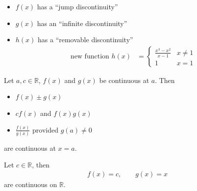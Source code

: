 \begin{itemize}
\item $f(x)$ has a ``jump discontinuity''
\item $g(x)$ has an ``infinite discontinuity''
\item $h(x)$ has a ``removable discontinuity''
\begin{align*}
\text{new function }h(x) &= \begin{cases}
\frac{x^3-x^2}{x-1} & x\neq 1\\
1 & x=1
\end{cases}
\end{align*}
\end{itemize}
\begin{theorem}\label{thm arith cont}
Let $a,c \in \mathbb{R}$, $f(x)$ and $g(x)$ be continuous at $a$. Then
\begin{itemize}
\item $f(x) \pm g(x)$
\item $c f(x)$ and $f(x) g(x)$
\item $\frac{f(x)}{g(x)}$ provided $g(a)\neq 0$
\end{itemize}
are continuous at $x=a$.
\end{theorem}
\begin{lemma}\label{lem_1_6_1}
Let $c \in \mathbb{R}$, then
\begin{align*}
f(x) = c,\qquad g(x) = x
\end{align*}
are continuous on $\mathbb{R}$.
\end{lemma}
